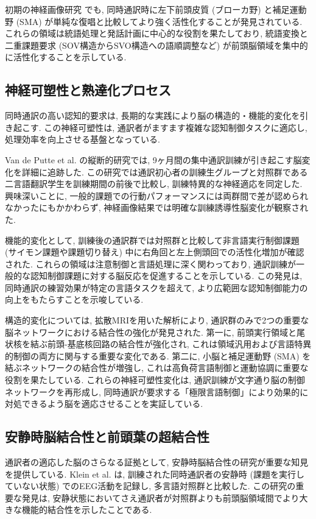 初期の神経画像研究 \cite{rinne2000left} でも, 同時通訳時に左下前頭皮質 (ブローカ野) と補足運動野 (SMA) が単純な復唱と比較してより強く活性化することが発見されている.
これらの領域は統語処理と発話計画に中心的な役割を果たしており, 統語変換と二重課題要求 (SOV構造からSVO構造への語順調整など) が前頭脳領域を集中的に活性化することを示している.

\subsection{神経可塑性と熟達化プロセス}

同時通訳の高い認知的要求は, 長期的な実践により脳の構造的・機能的変化を引き起こす.
この神経可塑性は, 通訳者がますます複雑な認知制御タスクに適応し, 処理効率を向上させる基盤となっている.

Van de Putte et al. \cite{vandeputte2018anatomical} の縦断的研究では, 9ヶ月間の集中通訳訓練が引き起こす脳変化を詳細に追跡した.
この研究では通訳初心者の訓練生グループと対照群である二言語翻訳学生を訓練期間の前後で比較し, 訓練特異的な神経適応を同定した.
興味深いことに, 一般的課題での行動パフォーマンスには両群間で差が認められなかったにもかかわらず, 神経画像結果では明確な訓練誘導性脳変化が観察された.

機能的変化として, 訓練後の通訳群では対照群と比較して非言語実行制御課題 (サイモン課題や課題切り替え) 中に右角回と左上側頭回での活性化増加が確認された.
これらの領域は注意制御と言語処理に深く関わっており, 通訳訓練が一般的な認知制御課題に対する脳反応を促進することを示している.
この発見は, 同時通訳の練習効果が特定の言語タスクを超えて, より広範囲な認知制御能力の向上をもたらすことを示唆している.

構造的変化については, 拡散MRIを用いた解析により, 通訳群のみで2つの重要な脳ネットワークにおける結合性の強化が発見された.
第一に, 前頭実行領域と尾状核を結ぶ前頭-基底核回路の結合性が強化され, これは領域汎用および言語特異的制御の両方に関与する重要な変化である.
第二に, 小脳と補足運動野 (SMA) を結ぶネットワークの結合性が増強し, これは高負荷言語制御と運動協調に重要な役割を果たしている.
これらの神経可塑性変化は, 通訳訓練が文字通り脳の制御ネットワークを再形成し, 同時通訳が要求する「極限言語制御」により効果的に対処できるよう脳を適応させることを実証している.

\subsection{安静時脳結合性と前頭葉の超結合性}

通訳者の適応した脳のさらなる証拠として, 安静時脳結合性の研究が重要な知見を提供している.
Klein et al. \cite{klein2018interpreter} は, 訓練された同時通訳者の安静時 (課題を実行していない状態) でのEEG活動を記録し, 多言語対照群と比較した.
この研究の重要な発見は, 安静状態においてさえ通訳者が対照群よりも前頭脳領域間でより大きな機能的結合性を示したことである.

